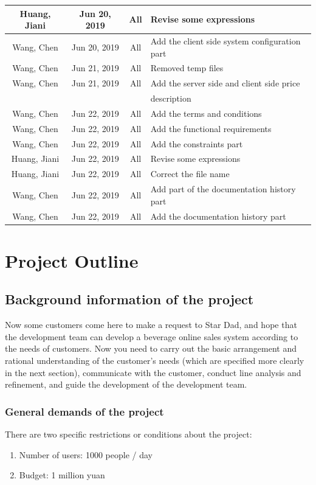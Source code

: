 \documentclass[a4paper]{report}
\begin{document}
\begin{tabular}{|c|c|c|l|}
\hline
Huang, Jiani&Jun 20, 2019&All&Revise some expressions\\
\hline
Wang, Chen&Jun 20, 2019&All&Add the client side system configuration part\\
\hline
Wang, Chen&Jun 21, 2019&All&Removed temp files\\
\hline
Wang, Chen&Jun 21, 2019&All&Add the server side and client side price \\
& & &description\\
\hline
Wang, Chen&Jun 22, 2019&All&Add the terms and conditions\\
\hline
Wang, Chen&Jun 22, 2019&All&Add the functional requirements\\
\hline
Wang, Chen&Jun 22, 2019&All&Add the constraints part\\
\hline
Huang, Jiani&Jun 22, 2019&All&Revise some expressions\\
\hline
Huang, Jiani&Jun 22, 2019&All&Correct the file name\\
\hline
Wang, Chen&Jun 22, 2019&All&Add part of the documentation history part\\
\hline
Wang, Chen&Jun 22, 2019&All&Add the documentation history part\\
\hline
\end{tabular}

\chapter{Project Outline}
\section{Background information of the project}
Now some customers come here to make a request to Star Dad, and hope that the development team can develop a beverage online sales system according to the needs of customers. Now you need to carry out the basic arrangement and rational understanding of the customer's needs (which are specified more clearly in the next section), communicate with the customer, conduct line analysis and refinement, and guide the development of the development team.
\par
\subsection{General demands of the project}
There are two specific restrictions or conditions about the project:
\begin{enumerate}
\item
Number of users: 1000 people / day
\item
Budget: 1 million yuan

\end{enumerate}
\end{document}
